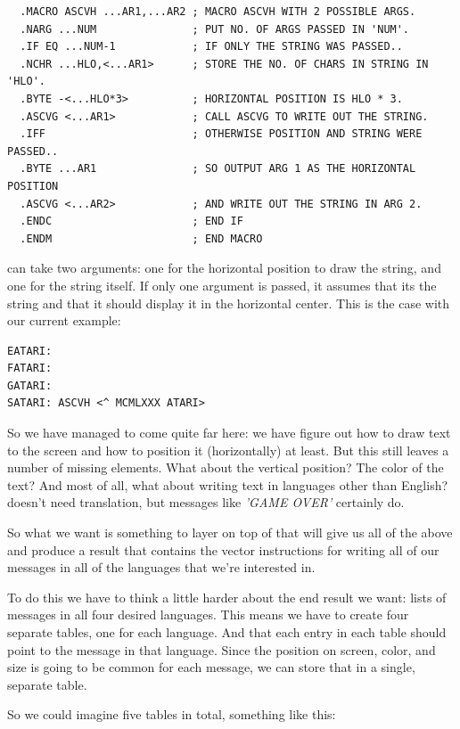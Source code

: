 \begin{lstlisting}
  .MACRO ASCVH ...AR1,...AR2 ; MACRO ASCVH WITH 2 POSSIBLE ARGS.
  .NARG ...NUM               ; PUT NO. OF ARGS PASSED IN 'NUM'.
  .IF EQ ...NUM-1            ; IF ONLY THE STRING WAS PASSED..
  .NCHR ...HLO,<...AR1>      ; STORE THE NO. OF CHARS IN STRING IN 'HLO'.
  .BYTE -<...HLO*3>          ; HORIZONTAL POSITION IS HLO * 3.
  .ASCVG <...AR1>            ; CALL ASCVG TO WRITE OUT THE STRING.
  .IFF                       ; OTHERWISE POSITION AND STRING WERE PASSED..
  .BYTE ...AR1               ; SO OUTPUT ARG 1 AS THE HORIZONTAL POSITION
  .ASCVG <...AR2>            ; AND WRITE OUT THE STRING IN ARG 2.
  .ENDC                      ; END IF
  .ENDM                      ; END MACRO
\end{lstlisting}

 can take two arguments: one for the horizontal position to draw the string,
and one for the string itself. If only one argument is passed, it assumes that its the string
and that it should display it in the horizontal center. This is the case with our current
example:

\begin{lstlisting}
EATARI:
FATARI:
GATARI:
SATARI:	ASCVH <^ MCMLXXX ATARI>
\end{lstlisting}

So we have managed to come quite far here: we have figure out how to draw text to the screen and
how to position it (horizontally) at least. But this still leaves a number of missing elements.
What about the vertical position? The color of the text? And most of all, what about writing
text in languages other than English?  doesn't need translation, but messages
like \textit{'GAME OVER'} certainly do.  

So what we want is something to layer on top of  that will give us all of the above
and produce a result that contains the vector instructions for writing all of our messages in all
of the languages that we're interested in.

To do this we have to think a little harder about the end result we want: lists of messages in all
four desired languages. This means we have to create four separate tables, one for each language.
And that each entry in each table should point to the message in that language. Since the position
on screen, color, and size is going to be common for each message, we can store that in a single,
separate table.

So we could imagine five tables in total, something like this:

